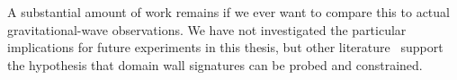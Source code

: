     A substantial amount of work remains if we ever want to compare this to actual gravitational-wave observations. We have not investigated the particular implications for future experiments in this thesis, but other literature~\citep{ferreiraGravitationalWavesDomain2023,clementsDetectingDarkDomain2023,paulGravitationalWaveSignatures2021,nakayamaGravitationalWavesDomain2017,hiramatsuEstimationGravitationalWave2014,hiramatsuGravitationalWavesCollapsing2010} support the hypothesis that domain wall signatures can be probed and constrained. 






















